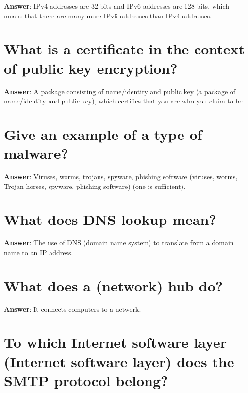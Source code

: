 \documentclass[a4paper,11pt,oneside]{book}
\begin{document}
\begin{sloppypar}
\label{q:140:sa:en:True}

\textbf{Answer}: IPv4 addresses are 32 bits and IPv6 addresses are 128 bits, which means that there are many more IPv6 addresses than IPv4 addresses.



\section{What is a certificate in the context of public key encryption?}

\label{q:141:sa:en:True}

\textbf{Answer}: A package consisting of name/identity and public key (a package of name/identity and public key), which certifies that you are who you claim to be.



\section{Give an example of a type of malware?}

\label{q:142:sa:en:True}

\textbf{Answer}: Viruses, worms, trojans, spyware, phishing software (viruses, worms, Trojan horses, spyware, phishing software) (one is sufficient).



\section{What does DNS lookup mean?}

\label{q:143:sa:en:True}

\textbf{Answer}: The use of DNS (domain name system) to translate from a domain name to an IP address.



\section{What does a (network) hub do?}

\label{q:144:sa:en:True}

\textbf{Answer}: It connects computers to a network.



\section{To which Internet software layer (Internet software layer) does the SMTP protocol belong?}


\end{sloppypar}
\end{document}
